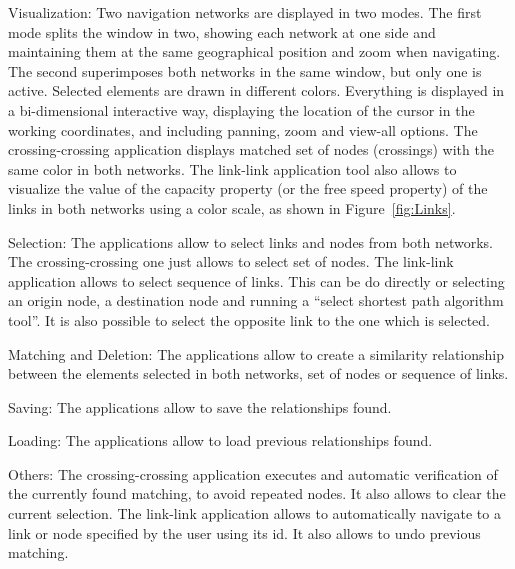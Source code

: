 \begin{compactitem}
\item Visualization: Two navigation networks are displayed in two modes. The first mode splits the window in two, showing each network at one side and maintaining them at the same geographical position and zoom when navigating. The second superimposes both networks in the same window, but only one is active. Selected elements are drawn in different colors. Everything is displayed in a bi-dimensional interactive way, displaying the location of the cursor in the working coordinates, and including panning, zoom and view-all options. The crossing-crossing application displays matched set of nodes (crossings) with the same color in both networks. The link-link application tool also allows to visualize the value of the capacity property (or the free speed property) of the links in both networks using a color scale, as shown in Figure~\ref{fig:Links}.
\item Selection: The applications allow to select links and nodes from both networks. The crossing-crossing one just allows to select set of nodes. The link-link application allows to select sequence of links. This can be do directly or selecting an origin node, a destination node and running a ``select shortest path algorithm tool''. It is also possible to select the opposite link to the one which is selected.
\item Matching and Deletion: The applications allow to create a similarity relationship between the elements selected in both networks, set of nodes or sequence of links.
\item Saving: The applications allow to save the relationships found.
\item Loading: The applications allow to load previous relationships found.
\item Others: The crossing-crossing application executes and automatic verification of the currently found matching, to avoid repeated nodes. It also allows to clear the current selection. The link-link application allows to automatically navigate to a link or node specified by the user using its id. It also allows to undo previous matching. 
\end{compactitem}

